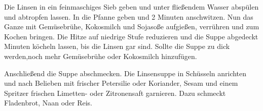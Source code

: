 \begin{recipeDP}
{        \step Die Linsen in ein feinmaschiges Sieb geben und unter fließendem Wasser abspülen und abtropfen lassen.
        In die Pfanne geben und 2 Minuten anschwitzen.
        Nun das Ganze mit Gemüsebrühe, Kokosmilch und Sojasoße aufgießen, verrühren und zum Kochen bringen.
        Die Hitze auf niedrige Stufe reduzieren und die Suppe abgedeckt  Minuten köcheln lassen, bis die Linsen gar sind.
        Sollte die Suppe zu dick werden,noch mehr Gemüsebrühe oder Kokosmilch hinzufügen.

        \step Anschließend die Suppe abschmecken.
        Die Linsensuppe in Schüsseln anrichten und nach Belieben mit frischer Petersilie oder Koriander, Sesam und einem Spritzer frischen Limetten- oder Zitronensaft garnieren. Dazu schmeckt Fladenbrot, Naan oder Reis.
    }



\end{recipeDP}